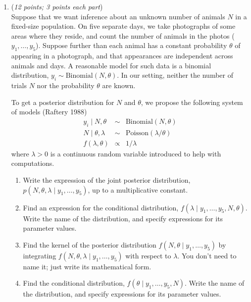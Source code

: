 \documentclass[11pt]{article}
\begin{document}
\begin{enumerate}
 \item
    ({\it{12 points; 3 points each part}}) \\
Suppose that we want inference about an unknown number of animals $N$ in a
  fixed-size population.  On five separate days, we take
  photographs of some areas where they reside, and count the number of
  animals in the photos ($y_1, \dots, y_5$).  Suppose further than
  each animal has a constant probability $\theta$ of appearing in a
  photograph, and that appearances are independent across animals and
  days.  A reasonable model for such data is a binomial distribution, $y_i \sim
\text{Binomial}(N, \theta)$.  In our setting, neither the number of trials $N$ nor the
probability $\theta$ are known.


To get a posterior distribution for $N$ and $\theta$, we propose the following system
of models (Raftery 1988)
\begin{eqnarray*}
y_i \mid N, \theta &\sim& \text{Binomial}(N, \theta) \\
N \mid \theta, \lambda &\sim& \text{Poisson}(\lambda / \theta) \\
f(\lambda , \theta) &\propto& 1 / \lambda
\end{eqnarray*}
where $\lambda > 0$ is a continuous random variable introduced to help
with computations.

\begin{enumerate}



\item Write the expression of the joint posterior distribution, $p(N,
  \theta, \lambda \mid y_1, \dots, y_5)$, up to a multiplicative
  constant.


\item Find an expression for the conditional distribution, $f(\lambda \mid y_1,
  \dots, y_5, N, \theta)$. Write the name of the distribution, and specify
expressions for its parameter values.


\item Find the kernel of the posterior distribution $f(N, \theta
  \mid y_1, \dots, y_5)$ by integrating $f(N, \theta, \lambda \mid y_1, \dots, y_5)$ with respect to
  $\lambda$.  You don't need to name it; just write its mathematical form.


\item Find the conditional distribution, $f(\theta \mid y_1,
  \dots, y_5, N)$. Write the name of the distribution, and specify
expressions for its parameter values.



\end{enumerate}
\end{enumerate}
\end{document}
